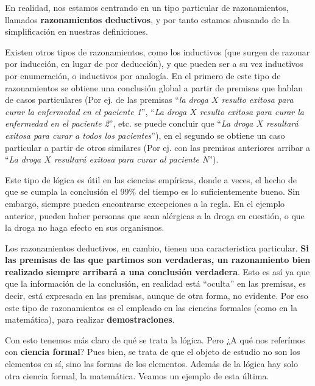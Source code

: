 \begin{knowwhat}
    En realidad, nos estamos centrando en un tipo particular de razonamientos,
    llamados \textbf{razonamientos deductivos}, y por tanto estamos abusando de
    la simplificación en nuestras definiciones.

    Existen otros tipos de razonamientos, como los inductivos (que surgen de
    razonar por inducción, en lugar de por deducción), y que pueden ser a su vez
    inductivos por enumeración, o inductivos por analogía. En el primero de este
    tipo de razonamientos se obtiene una conclusión global a partir de premisas
    que hablan de casos particulares (Por ej. de las premisas ``\textit{la droga
    $X$ resulto exitosa para curar la enfermedad en el paciente 1}'',
    ``\textit{La droga $X$ resulto exitosa para curar la enfermedad en el
    paciente 2}'', etc. se puede concluir que ``\textit{La droga $X$ resultará
    exitosa para curar a todos los pacientes}''), en el segundo se obtiene un
    caso particular a partir de otros similares (Por ej. con las premisas
    anteriores arribar a ``\textit{La droga $X$ resultará exitosa para curar al
    paciente N}'').

    Este tipo de lógica es útil en las ciencias empíricas, donde a veces, el
    hecho de que se cumpla la conclusión el 99\% del tiempo es lo
    suficientemente bueno. Sin embargo, siempre pueden encontrarse excepciones a
    la regla. En el ejemplo anterior, pueden haber personas que sean alérgicas a
    la droga en cuestión, o que la droga no haga efecto en sus organismos.

    Los razonamientos deductivos, en cambio, tienen una caracteristica
    particular. \textbf{Si las premisas de las que partimos son verdaderas, un
    razonamiento bien realizado siempre arribará a una conclusión verdadera}.
    Esto es así ya que que la información de la conclusión, en realidad está
    ``oculta'' en las premisas, es decir, está expresada en las premisas, aunque
    de otra forma, no evidente. Por eso este tipo de razonamientos es el
    empleado en las ciencias formales (como en la matemática), para realizar
    \textbf{demostraciones}.
\end{knowwhat}

Con esto tenemos más claro de qué se trata la lógica. Pero ¿A qué nos referímos
con \textbf{ciencia formal}? Pues bien, se trata de que el
objeto de estudio no son los elementos en sí, sino las formas de los elementos.
Además de la lógica hay solo otra ciencia formal, la matemática. Veamos un
ejemplo de esta última.

